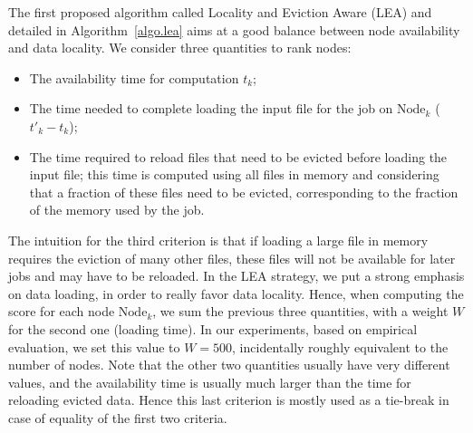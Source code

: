\documentclass[conference,10pt]{IEEEtran}
\newcommand{\Node}[1]{\ensuremath{\mathrm{Node}_{#1}}\xspace}
\begin{document}
The first proposed algorithm called Locality and Eviction Aware (LEA)
and detailed in Algorithm~\ref{algo.lea} aims at a good balance
between node availability and data locality.  We consider three
quantities to rank nodes:
\begin{itemize}
\item The availability time for computation $t_k$;
\item The time needed to complete loading the input file for the job
  on \Node{k} ($t'_k - t_k$);
\item The time required to reload files that need to be evicted before
  loading the input file; this time is computed using all files in
  memory and considering that a fraction of these files need to be
  evicted, corresponding to the fraction of the memory used by the job.
\end{itemize}

The intuition for the third criterion is that if loading a large file
in memory requires the eviction of many other files, these files will not
be available for later jobs and may have to be reloaded.
In the LEA strategy, we put a strong emphasis on data loading, in order
to really favor data locality. Hence, when computing the score for
each node \Node{k}, we sum the previous three quantities, with a weight
$W$ for the second one (loading time). In our experiments, based on
empirical evaluation, we set this value to $W=500$, incidentally roughly
equivalent to the number of nodes.
Note that the other two quantities usually have very different values,
and the availability time is usually much larger than the time for
reloading evicted data. Hence this last criterion is mostly used as a
tie-break in case of equality of the first two criteria.
\end{document}
